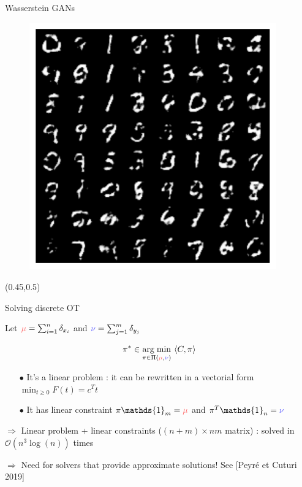 \documentclass[pdf,aspectratio=169,10pt]{beamer}
\begin{document}
\begin{frame}{ Wasserstein GANs}
\begin{minipage}{0.32\textwidth}
\begin{figure}
        \centering
            \includegraphics[width=0.95\textwidth]{../img/wgan_mnist.pdf}
            \centerline{}
        \end{figure}
\end{minipage}
\begin{textblock}{0.45}(0.45,0.5)
    \end{textblock}

\end{frame}

\begin{frame}{Solving discrete OT}

Let $\er{\mu}=\sum_{i=1}^n\delta_{x_i}$ and $\eb{\nu}=\sum_{j=1}^m\delta_{y_j}$
\begin{block}{}
$$\pi^\ast \in \underset{\pi\in\Pi(\er{\mu},\eb{\nu})}{\argmin} \ \langle C, \pi \rangle$$
\end{block}

{\vspace{0.3cm}\begin{itemize}
\item[$\bullet$] It's a linear problem : it can be rewritten in a vectorial form $\min_{t\geq 0} F(t) = c^Tt$
\item[$\bullet$] It has linear constraint $\pi\mathds{1}_m =\er{\mu}$ and $\pi^T\mathds{1}_n=\eb{\nu}$
\end{itemize}
\vspace{0.1cm}$\Longrightarrow$ Linear problem + linear constraints ($(n+m)\times nm$ matrix) : solved in $\mathcal{O}(n^3\log(n))$ times}

{\vspace{0.3cm}$\Longrightarrow$ Need for solvers that provide approximate solutions! See [Peyré et Cuturi 2019]}
\end{frame}
\end{document}
